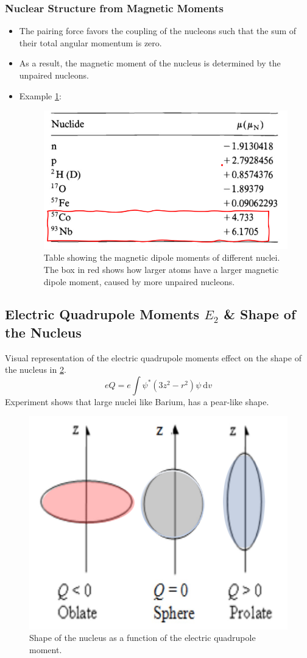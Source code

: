 \subsubsection{Nuclear Structure from Magnetic Moments}
\begin{itemize}
    \item The pairing force favors the coupling of the nucleons such that the sum of their total angular momentum is zero. 
    \item As a result, the magnetic moment of the nucleus is determined by the unpaired nucleons.
    \item Example \cref{fig: nuclear_magnetic_dipole_samples}:
    \begin{figure}[h!]
    \centering
    \includegraphics[width = .75\textwidth]{nuclear_magnetic_dipole_samples.png}
    \caption{Table showing the magnetic dipole moments of different nuclei. The box in red shows how larger atoms have a larger magnetic dipole moment, caused by more unpaired nucleons.}
    \label{fig: nuclear_magnetic_dipole_samples}
    \end{figure}
    
\end{itemize}

\subsection{Electric Quadrupole Moments $E_2$ \& Shape of the Nucleus}
Visual representation of the electric quadrupole moments effect on the shape of the nucleus in \cref{fig: nucleus_shape_E2}. 
\begin{equation}
  eQ = e ∫ ψ^{*}(3z^2 - r^2)ψ \ \mathrm{d}v
\end{equation}
Experiment shows that large nuclei like Barium, has a pear-like shape. 
\begin{figure}[h!]
\centering
\includegraphics[width = .5\textwidth]{nucleus_shape_E2.png}
\caption{Shape of the nucleus as a function of the electric quadrupole moment.}
\label{fig: nucleus_shape_E2}
\end{figure}

